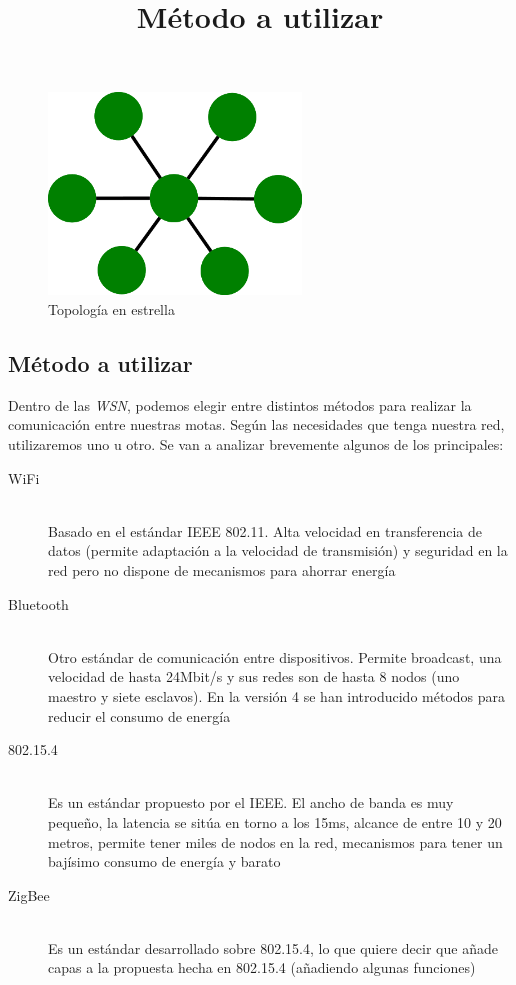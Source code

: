 \begin{figure}[htb]
\centering
\includegraphics[width=0.6\textwidth]{./imagenes/estrella}
\caption{Topología en estrella} \label{fig:estrella}
\end{figure}

\subsection{Método a utilizar}
\title{Método a utilizar}
Dentro de las \textit{WSN}, podemos elegir entre distintos métodos para realizar la
comunicación entre nuestras motas. Según las necesidades que tenga nuestra red,
utilizaremos uno u otro. Se van a analizar brevemente algunos de los principales:

\begin{description}
  \item[WiFi] \hfill \\
    Basado en el estándar IEEE 802.11. Alta velocidad en transferencia de datos
    (permite adaptación a la velocidad de transmisión) y seguridad en la red pero
    no dispone de mecanismos para ahorrar energía
  \item[Bluetooth] \hfill \\
    Otro estándar de comunicación entre dispositivos. Permite broadcast, una velocidad
    de hasta 24Mbit/s y sus redes son de hasta 8 nodos (uno maestro y siete esclavos).
    En la versión 4 se han introducido métodos para reducir el consumo de energía
  \item[802.15.4] \hfill \\
    Es un estándar propuesto por el IEEE. El ancho de banda es muy pequeño, la latencia
    se sitúa en torno a los 15ms, alcance de entre 10 y 20 metros, permite tener miles
    de nodos en la red, mecanismos para tener un bajísimo consumo de energía y barato
  \item[ZigBee] \hfill \\
    Es un estándar desarrollado sobre 802.15.4, lo que quiere decir que añade capas a la
    propuesta hecha en 802.15.4 (añadiendo algunas funciones)
\end{description}

